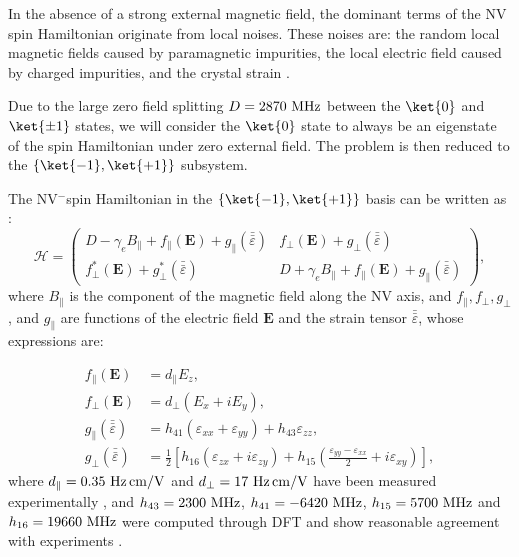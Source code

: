 \documentclass[a4paper, 11pt]{report}
\begin{document}
In the absence of a strong external magnetic field, the dominant terms of the NV spin Hamiltonian originate from local noises. These noises are: the random local magnetic fields caused by paramagnetic impurities, the local electric field caused by charged impurities, and the crystal strain \citep{doherty2012theory, udvarhelyi2018spin, mittiga2018imaging}. 

Due to the large zero field splitting $D=2870\ \rm MHz$ between the $\ket{0}$ and $\ket{\pm 1}$ states, we will consider the $\ket{0}$ state to always be an eigenstate of the spin Hamiltonian under zero external field. The problem is then reduced to the $\{ \ket{-1}, \ket{+1} \}$ subsystem.

The NV$^-$spin Hamiltonian in the $\{ \ket{-1}, \ket{+1} \}$ basis can be written as \citep{udvarhelyi2018spin}:
\begin{equation}
\mathcal{H}=\begin{pmatrix}
D-\gamma_e B_\parallel + f_\parallel(\mathbf{E}) + g_\parallel(\bar{\bar{\varepsilon}}) & f_\perp(\mathbf{E}) + g_\perp(\bar{\bar{\varepsilon}})\\
f^*_\perp(\mathbf{E}) + g^*_\perp(\bar{\bar{\varepsilon}})&D+\gamma_e B_\parallel + f_\parallel(\mathbf{E}) + g_\parallel(\bar{\bar{\varepsilon}})
\end{pmatrix},
\label{Hamiltonien pm1}
\end{equation}
where $B_\parallel$ is the component of the magnetic field along the NV axis, and $f_\parallel, f_\perp, g_\perp$, and $g_\parallel$ are functions of the electric field $\mathbf{E}$ and the strain tensor $\bar{\bar{\varepsilon}}$, whose expressions are:

\begin{align}
f_\parallel(\mathbf{E})&=d_\parallel E_z, \\
f_\perp(\mathbf{E})&=d_\perp ( E_x + i E_y), \\
g_\parallel(\bar{\bar{\varepsilon}})&= h_{41}(\varepsilon_{xx}+\varepsilon_{yy})+h_{43} \varepsilon_{zz}, \\
g_\perp(\bar{\bar{\varepsilon}}) &= \frac{1}{2} \left[ h_{16}(\varepsilon_{zx}+i \varepsilon_{zy}) + h_{15}\left(\frac{\varepsilon_{yy}-\varepsilon_{xx}}{2}+i\varepsilon_{xy}\right) \right],
\end{align}
where $d_\parallel=0.35 \ \rm{Hz\, cm/V}$ and $d_\perp=17\ \rm{Hz\, cm/V}$ have been measured experimentally \citep{van1990electric}, and $h_{43}=2300\ \rm{MHz}$, $h_{41}=-6420\ \rm{MHz}$, $h_{15}=5700\ \rm{MHz}$ and $h_{16}=19660\ \rm{MHz}$ were computed through DFT \citep{udvarhelyi2018spin} and show reasonable agreement with experiments \citep{barson2017nanomechanical}.
\end{document}
